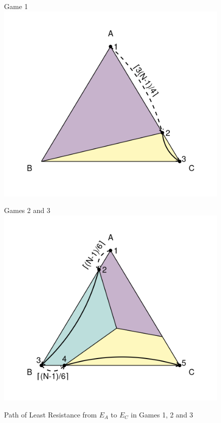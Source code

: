 \begin{figure}[h]
\captionsetup{justification=centering}
  \caption{Path of Least Resistance from $E_A$ to $E_C$ in Games 1, 2 and 3}
   \label{fig:ResistancePlotsTheory}

\vskip12pt
\begin{minipage}[c]{.49\textwidth}
\centering
Game 1 
\vskip6pt
\includegraphics[width = \textwidth]{Images/Resistance1.6.png}
\end{minipage}
\begin{minipage}[c]{.49\textwidth}
\centering
Games 2 and 3 
\vskip6pt
\includegraphics[width = \textwidth]{Images/Resistance23.6.png}

\end{minipage}
\end{figure}
